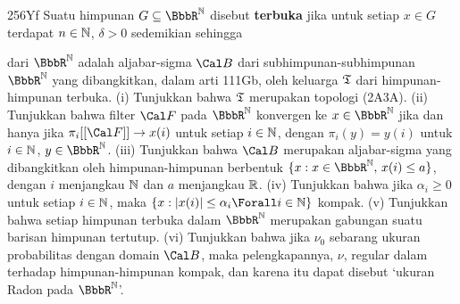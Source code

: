 {\spheader 256Yf Suatu himpunan
$G\subseteq\BbbR^{\Bbb N}$ disebut {\bf terbuka} jika untuk setiap $x\in G$
terdapat $n\in\Bbb N$, $\delta>0$ sedemikian sehingga


 dari $\BbbR^{\Bbb N}$ adalah
aljabar-sigma $\Cal B$ dari subhimpunan-subhimpunan
$\BbbR^{\Bbb N}$ yang dibangkitkan, dalam arti 111Gb, oleh keluarga
$\frak T$ dari himpunan-himpunan terbuka. (i) Tunjukkan bahwa $\frak T$
merupakan topologi (2A3A).
(ii) Tunjukkan bahwa filter $\Cal F$ pada $\BbbR^{\Bbb N}$ konvergen ke
$x\in\BbbR^{\Bbb N}$ jika dan hanya jika $\pi_i[[\Cal F]]\to x(i)$ untuk
setiap $i\in\Bbb N$, dengan
$\pi_i(y)=y(i)$ untuk $i\in\Bbb N$, $y\in\BbbR^{\Bbb N}$. (iii)
Tunjukkan bahwa $\Cal B$ merupakan aljabar-sigma yang dibangkitkan oleh
himpunan-himpunan berbentuk
$\{x:x\in \BbbR^{\Bbb N},\,x(i)\le a\}$,
dengan $i$ menjangkau $\Bbb N$ dan $a$ menjangkau $\Bbb R$.
(iv) Tunjukkan bahwa jika $\alpha_i\ge 0$ untuk setiap $i\in\Bbb N$, maka
$\{x:|x(i)|\le\alpha_i\Forall i\in\Bbb N\}$ kompak.
(v) Tunjukkan bahwa setiap himpunan terbuka dalam $\BbbR^{\Bbb N}$ merupakan
gabungan suatu barisan himpunan tertutup.  (vi) Tunjukkan bahwa jika $\nu_0$ sebarang ukuran
probabilitas dengan domain $\Cal B$, maka pelengkapannya, $\nu$, regular dalam
terhadap himpunan-himpunan kompak, dan karena itu dapat disebut `ukuran Radon
pada $\BbbR^{\Bbb N}$'. 
}%


